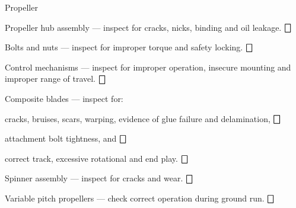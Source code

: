 \begin{enumerate*}
	\item{Propeller} 
	\begin{enumerate*}
	  \item Propeller hub assembly --- inspect for cracks, nicks, binding and oil leakage. \dotfill $\bigbox$
	  \item Bolts and nuts --- inspect for improper torque and safety locking. \dotfill $\bigbox$
	  \item Control mechanisms --- inspect for improper operation, insecure mounting and improper range of travel. \dotfill $\bigbox$
	  \item Composite blades --- inspect for:
	  \begin{enumerate*}
	    \item cracks, bruises, scars, warping, evidence of glue failure and delamination, \dotfill $\bigbox$
	    \item attachment bolt tightness, and \dotfill $\bigbox$
	    \item correct track, excessive rotational and end play. \dotfill $\bigbox$

  	  \end{enumerate*}
  	\item Spinner assembly --- inspect for cracks and wear. \dotfill $\bigbox$
  	\item Variable pitch propellers --- check correct operation during ground run. \dotfill $\bigbox$
	\end{enumerate*}



\end{enumerate*}

